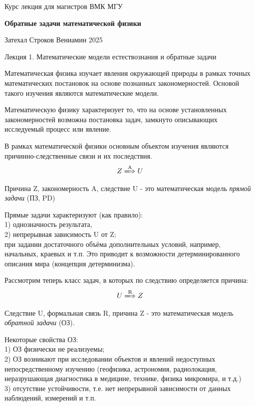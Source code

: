 \documentclass{article}
\begin{document}
\centerline{\large Курс лекция для магистров ВМК МГУ}
\centerline {\textbf{\LARGE Обратные задачи математической физики}}
\centerline {Затехал Строков Вениамин 2025}

\vspace{0.4cm}

\centerline{\LARGE Лекция 1. Математические модели естествознания и обратные задачи}

\vspace{0.5cm}

Математическая физика изучает явления окружающей природы в рамках точных математических постановок на основе познанных закономерностей.
Основой такого изучения являются математические модели.

Математическую физику характеризует то, что на основе установленных закономерностей возможна постановка задач, замкнуто описывающих исследуемый процесс или явление.

В рамках математической физики основным объектом изучения являются причинно-следственные связи и их последствия.
\begin{equation*}
	Z \xLongrightarrow{\text{A}} U
\end{equation*}

Причина Z, закономерность A, следствие U - это математическая модель \textit{прямой задачи} (ПЗ, PD)

Прямые задачи характеризуют (как правило):\\
1) однозначность результата,\\
2) непрерывная зависимость U от Z;\\
при задании достаточного объёма дополнительных условий, например, начальных, краевых и т.п. Это приводит к возможности детерминированного описания мира (концепция детерминизма).

\bigskip

Рассмотрим теперь класс задач, в которых по следствию определяется причина:
\begin{equation*}
	U \xLongrightarrow{\text{R}} Z
\end{equation*}

Следствие U, формальная связь R, причина Z - это математическая модель \textit{обратной задачи} (ОЗ).

Некоторые свойства ОЗ:\\
1) ОЗ физически не реализуемы;\\
2) ОЗ возникают при исследовании объектов и явлений недоступных непосредственному изучению (геофизика, астрономия, радиолокация, неразрушающая диагностика в медицине, технике, физика микромира, и т.д.)\\
3) отсутствие устойчивости, т.е. нет непрерывной зависимости от данных наблюдений, измерений и т.п.
\end{document}
